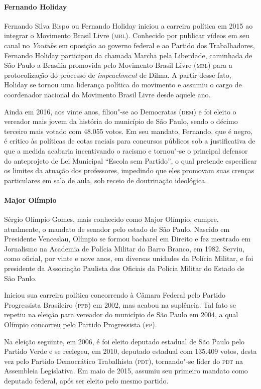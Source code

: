 \begin{bibliohedra}
\paragraph{Fernando Holiday} Fernando Silva Bispo ou Fernando Holiday iniciou a carreira política em
2015 ao integrar o Movimento Brasil Livre (\textsc{mbl}). Conhecido por publicar
vídeos em seu canal no \textit{Youtube} em oposição ao governo federal e
ao Partido dos Trabalhadores, Fernando Holiday participou da chamada
Marcha pela Liberdade, caminhada de São Paulo a Brasília promovida pelo
Movimento Brasil Livre (\textsc{mbl}) para a protocolização do processo de
\textit{impeachment} de Dilma. A partir desse fato, Holiday se tornou uma
liderança política do movimento e assumiu o cargo de coordenador
nacional do Movimento Brasil Livre desde aquele ano.

Ainda em 2016, aos vinte anos, filiou"-se ao Democratas (\textsc{dem}) e foi
eleito o vereador mais jovem da história do município de São Paulo,
sendo o décimo terceiro mais votado com 48.055 votos. Em seu mandato,
Fernando, que é negro, é crítico às políticas de cotas raciais para
concursos públicos sob a justificativa de que a medida acabaria
incentivando o racismo e tornou"-se o principal defensor do anteprojeto
de Lei Municipal ``Escola sem Partido'', o qual pretende especificar os
limites da atuação dos professores, impedindo que eles promovam suas
crenças particulares em sala de aula, sob receio de doutrinação
ideológica.

\paragraph{Major Olímpio} Sérgio Olímpio Gomes, mais conhecido como Major Olímpio, cumpre,
atualmente, o mandato de senador pelo estado de São Paulo. Nascido em
Presidente Venceslau, Olímpio se formou bacharel em Direito e fez
mestrado em Jornalismo na Academia de Polícia Militar do Barro Branco,
em 1982. Serviu, como oficial, por vinte e nove anos, em diversas
unidades da Polícia Militar, e foi presidente da Associação Paulista dos
Oficiais da Polícia Militar do Estado de São Paulo.

Iniciou sua carreira política concorrendo à Câmara Federal pelo Partido
Progressista Brasileiro (\textsc{ppb}) em 2002, mas acabou na suplência. Tal fato
se repetiu na eleição para vereador do município de São Paulo em 2004, a
qual Olímpio concorreu pelo Partido Progressista (\textsc{pp}).

Na eleição seguinte, em 2006, é foi eleito deputado estadual de São
Paulo pelo Partido Verde e se reelegeu, em 2010, deputado estadual com
135.409 votos, desta vez pelo Partido Democrático Trabalhista (\textsc{pdt}),
tornando"-se líder do \textsc{pdt} na Assembleia Legislativa. Em maio de 2015,
assumiu seu primeiro mandato como deputado federal, após ser eleito pelo
mesmo partido.


\end{bibliohedra}
